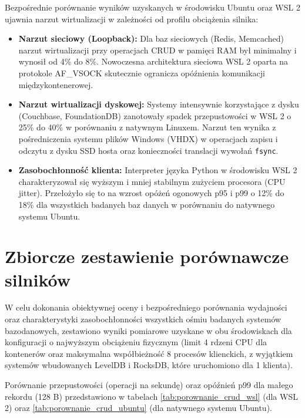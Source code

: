 Bezpośrednie porównanie wyników uzyskanych w środowisku Ubuntu oraz WSL 2 ujawnia narzut wirtualizacji w zależności od profilu obciążenia silnika:
\begin{itemize}
    \item \textbf{Narzut sieciowy (Loopback):} Dla baz sieciowych (Redis, Memcached) narzut wirtualizacji przy operacjach CRUD w pamięci RAM był minimalny i wynosił od 4\% do 8\%. Nowoczesna architektura sieciowa WSL 2 oparta na protokole AF\_VSOCK skutecznie ogranicza opóźnienia komunikacji międzykontenerowej.
    \item \textbf{Narzut wirtualizacji dyskowej:} Systemy intensywnie korzystające z dysku (Couchbase, FoundationDB) zanotowały spadek przepustowości w WSL 2 o 25\% do 40\% w porównaniu z natywnym Linuxem. Narzut ten wynika z pośredniczenia systemu plików Windows (VHDX) w operacjach zapisu i odczytu z dysku SSD hosta oraz konieczności translacji wywołań \texttt{fsync}.
    \item \textbf{Zasobochłonność klienta:} Interpreter języka Python w środowisku WSL 2 charakteryzował się wyższym i mniej stabilnym zużyciem procesora (CPU jitter). Przełożyło się to na wzrost opóżeń ogonowych p95 i p99 o 12\% do 18\% dla wszystkich badanych baz danych w porównaniu do natywnego systemu Ubuntu.
\end{itemize}

\section{Zbiorcze zestawienie porównawcze silników}
\label{sec:porownanie_miedzy_bazami}

W celu dokonania obiektywnej oceny i bezpośredniego porównania wydajności oraz charakterystyki zasobochłonności wszystkich ośmiu badanych systemów bazodanowych, zestawiono wyniki pomiarowe uzyskane w obu środowiskach dla konfiguracji o najwyższym obciążeniu fizycznym (limit 4 rdzeni CPU dla kontenerów oraz maksymalna współbieżność 8 procesów klienckich, z wyjątkiem systemów wbudowanych LevelDB i RocksDB, które uruchomiono dla 1 klienta).

Porównanie przepustowości (operacji na sekundę) oraz opóźnień p99 dla małego rekordu (128 B) przedstawiono w tabelach \ref{tab:porownanie_crud_wsl} (dla WSL 2) oraz \ref{tab:porownanie_crud_ubuntu} (dla natywnego systemu Ubuntu).




